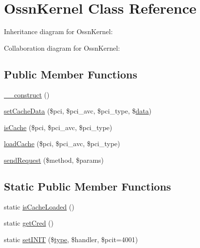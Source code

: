 \hypertarget{class_ossn_kernel}{}\section{Ossn\+Kernel Class Reference}
\label{class_ossn_kernel}


Inheritance diagram for Ossn\+Kernel\+:


Collaboration diagram for Ossn\+Kernel\+:
\subsection*{Public Member Functions}
\begin{DoxyCompactItemize}
\item 
\hyperlink{class_ossn_kernel_a095c5d389db211932136b53f25f39685}{\+\_\+\+\_\+construct} ()
\item 
\hyperlink{class_ossn_kernel_a09aa5acfd0c7e72f09205e842637fcae}{set\+Cache\+Data} (\$pci, \$pci\+\_\+avc, \$pci\+\_\+type, \$\hyperlink{components_2_ossn_comments_2actions_2comment_2edit_8php_a2b67189b42ab547221cb2a6408f4746a}{data})
\item 
\hyperlink{class_ossn_kernel_a704886c1ba152c9a29966c0050760134}{is\+Cache} (\$pci, \$pci\+\_\+avc, \$pci\+\_\+type)
\item 
\hyperlink{class_ossn_kernel_ab152a9c36095ce6e0a1e39ba1450f344}{load\+Cache} (\$pci, \$pci\+\_\+avc, \$pci\+\_\+type)
\item 
\hyperlink{class_ossn_kernel_af2ec14d082a86dcd02cfaef77bcde528}{send\+Request} (\$method, \$params)
\end{DoxyCompactItemize}
\subsection*{Static Public Member Functions}
\begin{DoxyCompactItemize}
\item 
static \hyperlink{class_ossn_kernel_a11295191032f1121bb6a5ad4aa120423}{is\+Cache\+Loaded} ()
\item 
static \hyperlink{class_ossn_kernel_a4dd43bbb716da2be041da2cc069aa02b}{get\+Cred} ()
\item 
static \hyperlink{class_ossn_kernel_a95becdb9294cd74db7309ebdbdf0a03b}{set\+I\+N\+IT} (\$\hyperlink{_ossn_wall_2actions_2wall_2post_2group_8php_a2dc1bb4e1ed0029daa81ac0776b14b51}{type}, \$handler, \$pcit=4001)
\end{DoxyCompactItemize}


